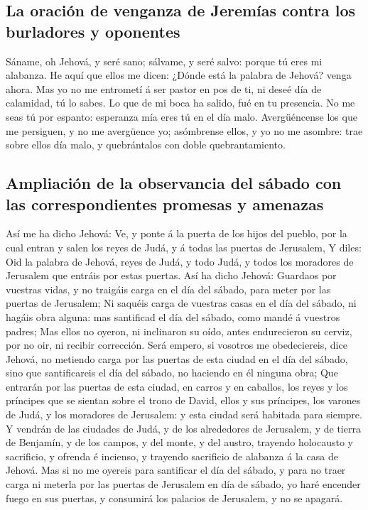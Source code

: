 \hypertarget{la-oraciuxf3n-de-venganza-de-jeremuxedas-contra-los-burladores-y-oponentes}{%
\subsection{La oración de venganza de Jeremías contra los burladores y
oponentes}\label{la-oraciuxf3n-de-venganza-de-jeremuxedas-contra-los-burladores-y-oponentes}}

 Sáname, oh Jehová, y seré sano; sálvame, y seré salvo:
porque tú eres mi alabanza.  He aquí que ellos me dicen:
¿Dónde está la palabra de Jehová? venga ahora.  Mas yo no
me entrometí á ser pastor en pos de ti, ni deseé día de calamidad, tú lo
sabes. Lo que de mi boca ha salido, fué en tu presencia. 
No me seas tú por espanto: esperanza mía eres tú en el día malo.
 Avergüéncense los que me persiguen, y no me avergüence
yo; asómbrense ellos, y yo no me asombre: trae sobre ellos día malo, y
quebrántalos con doble quebrantamiento.

\hypertarget{ampliaciuxf3n-de-la-observancia-del-suxe1bado-con-las-correspondientes-promesas-y-amenazas}{%
\subsection{Ampliación de la observancia del sábado con las
correspondientes promesas y
amenazas}\label{ampliaciuxf3n-de-la-observancia-del-suxe1bado-con-las-correspondientes-promesas-y-amenazas}}

 Así me ha dicho Jehová: Ve, y ponte á la puerta de los
hijos del pueblo, por la cual entran y salen los reyes de Judá, y á
todas las puertas de Jerusalem,  Y diles: Oid la palabra
de Jehová, reyes de Judá, y todo Judá, y todos los moradores de
Jerusalem que entráis por estas puertas.  Así ha dicho
Jehová: Guardaos por vuestras vidas, y no traigáis carga en el día del
sábado, para meter por las puertas de Jerusalem;  Ni
saquéis carga de vuestras casas en el día del sábado, ni hagáis obra
alguna: mas santificad el día del sábado, como mandé á vuestros padres;
 Mas ellos no oyeron, ni inclinaron su oído, antes
endurecieron su cerviz, por no oir, ni recibir corrección.
 Será empero, si vosotros me obedeciereis, dice Jehová,
no metiendo carga por las puertas de esta ciudad en el día del sábado,
sino que santificareis el día del sábado, no haciendo en él ninguna
obra;  Que entrarán por las puertas de esta ciudad, en
carros y en caballos, los reyes y los príncipes que se sientan sobre el
trono de David, ellos y sus príncipes, los varones de Judá, y los
moradores de Jerusalem: y esta ciudad será habitada para siempre.
 Y vendrán de las ciudades de Judá, y de los alrededores
de Jerusalem, y de tierra de Benjamín, y de los campos, y del monte, y
del austro, trayendo holocausto y sacrificio, y ofrenda é incienso, y
trayendo sacrificio de alabanza á la casa de Jehová.  Mas
si no me oyereis para santificar el día del sábado, y para no traer
carga ni meterla por las puertas de Jerusalem en día de sábado, yo haré
encender fuego en sus puertas, y consumirá los palacios de Jerusalem, y
no se apagará.

